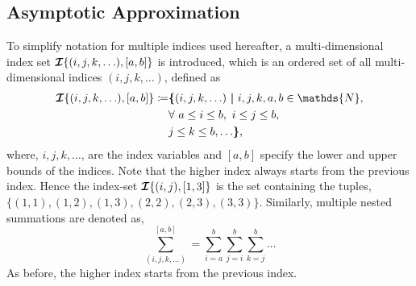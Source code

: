 \subsection{Asymptotic Approximation}
\label{sec:asymptotic_center_manifold}

To simplify notation for multiple indices used hereafter, a multi-dimensional index set $\bm{\mathcal{I}}\{(i,j,k,\ldots),[a,b]\}$ is introduced, which is an ordered set of all multi-dimensional indices $(i,j,k,\ldots)$, defined as 
\begin{equation}
	\label{eqn:index_set}
	\begin{split}
		\IndexSet{i,j,k,\ldots}{a,b} \coloneq &  \bm{\lbrace} (i,j,k,\ldots)\ \bm{|}\ i,j,k,a,b \in\mathds{N}, \\
					 & \forall\ a\le i \le b,\ i\le j \le b ,		\\
					& j\le k \le b,  \ldots \bm{\rbrace},
	\end{split}
\end{equation}
where, $i,j,k,\ldots$, are the index variables and $[a,b]$ specify the lower and upper bounds of the indices. Note that the higher index always starts from the previous index.
Hence the index-set $\bm{\mathcal{I}}\{(i,j),[1,3]\}$ is the set containing the tuples, $\{(1,1), (1,2), (1,3), (2,2), (2,3), (3,3)\}$. Similarly, multiple nested summations are denoted as,
\begin{equation}
	\label{eqn:summation}
	\sum_{(i,j,k,\ldots)}^{[a,b]} = \sum_{i=a}^{b}\sum_{j=i}^{b}\sum_{k=j}^{b}\ldots
\end{equation}
As before, the higher index starts from the previous index.

